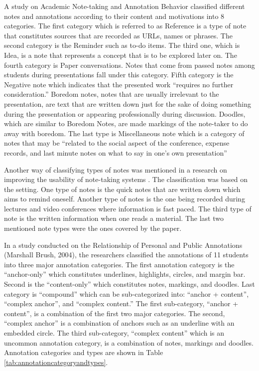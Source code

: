 A study on Academic Note-taking and Annotation Behavior \cite{Cunningham:2005:TNA:1065385.1065477} classified different notes and annotations according to their content and motivations into 8 categories. The first category which is referred to as Reference is a type of note that constitutes sources that are recorded as URLs, names or phrases. The second category is the Reminder such as to-do items. The third one, which is Idea, is a note that represents a concept that is to be explored later on. The fourth category is Paper conversations. Notes that come from passed notes among students during presentations fall under this category. Fifth category is the Negative note which indicates that the presented work ``requires no further consideration.'' Boredom notes, notes that are usually irrelevant to the presentation, are text that are written down just for the sake of doing something during the presentation or appearing professionally during discussion. Doodles, which are similar to Boredom Notes, are made markings of the note-taker to do away with boredom. The last type is Miscellaneous note which is a category of notes that may be ``related to the social aspect of the conference, expense records, and last minute notes on what to say in one's own presentation''

Another way of classifying types of notes was mentioned in a research on improving the usability of note-taking systems \cite{samulviciute:2009}. The classification was based on the setting. One type of notes is the quick notes that are written down which aims to remind oneself. Another type of notes is the one being recorded during lectures and video conferences where information is fast paced. The third type of note is the written information when one reads a material. The last two mentioned note types were the ones covered by the paper.

In a study conducted on the Relationship of Personal and Public Annotations (Marshall Brush, 2004), the researchers classified the annotations of 11 students into three major annotation categories. The first annotation category is the ``anchor-only'' which constitutes underlines, highlights, circles, and margin bar. Second is the ``content-only'' which constitutes notes, markings, and doodles. Last category is ``compound'' which can be sub-categorized into: ``anchor + content'', ``complex anchor'', and ``complex content.'' The first sub-category, ``anchor + content'', is a combination of the first two major categories. The second, ``complex anchor'' is a combination of anchors such as an underline with an embedded circle. The third sub-category, ``complex content'' which is an uncommon annotation category, is a combination of notes, markings and doodles. Annotation categories and types are shown in Table \ref{tab:annotationcategoryandtypes}.

